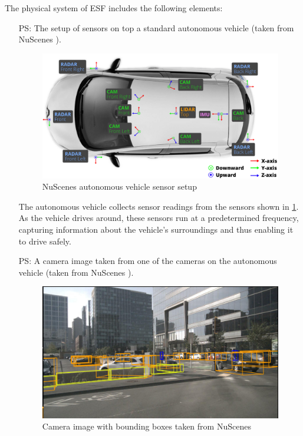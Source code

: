 \documentclass[12pt]{article}
\newcounter{psysnum} %
\newcommand{\ProjectName}{ESF }
\begin{document}
The physical system of \ProjectName includes the following elements:

\begin{itemize}

\item [PS\refstepcounter{psysnum}\thepsysnum \label{Autonomous Vehicle}:] The setup of sensors on top a standard autonomous vehicle (taken from NuScenes \cite{caesar2020nuscenes}). 
\begin{figure}[H]
  \centering
  \includegraphics[width=15cm]{NuScenes_Vehicle.png}
  \caption{NuScenes autonomous vehicle sensor setup}\label{fig:AutoVehicle}
\end{figure}

The autonomous vehicle collects sensor readings from the sensors shown in \ref{fig:AutoVehicle}. As the vehicle drives around, these sensors 
run at a predetermined frequency, capturing information about the vehicle's surroundings and thus enabling it to drive safely.

\item [PS\refstepcounter{psysnum}\thepsysnum \label{Camera Images}:] A camera image taken from one of the cameras on the autonomous vehicle (taken from NuScenes \cite{caesar2020nuscenes}).
\begin{figure}[H]
  \centering
  \includegraphics[width=15cm]{Camera_View.png}
  \caption{Camera image with bounding boxes taken from NuScenes}\label{fig:CameraView}
\end{figure}


\end{itemize}
\end{document}
